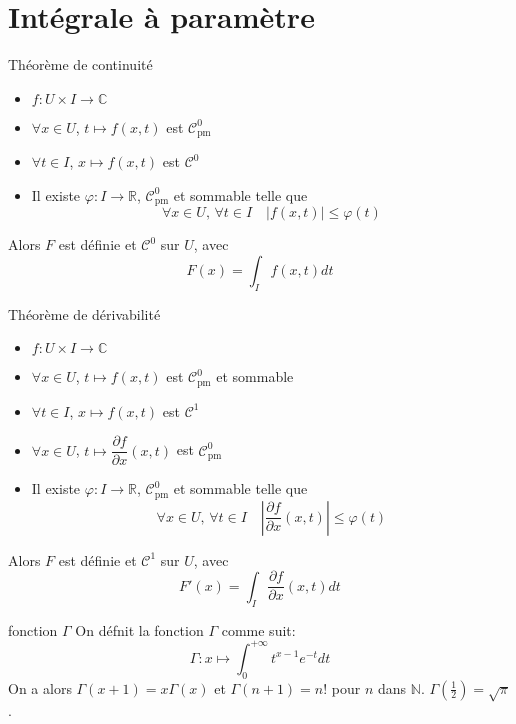 \documentclass[french, a4paper, 10pt, twocolumn]{article}
\newcommand{\N}{\mathbb{N}}   %
\newcommand{\R}{\mathbb{R}}   %
\newcommand{\C}{\mathbb{C}}   %
\newcommand{\czero}{\mathcal{C}^{0}}
\newcommand{\cun}{\mathcal{C}^{1}}
\renewcommand{\phi}{\varphi}
\begin{document}
\section{Intégrale à paramètre}
\begin{theoreme}{Théorème de continuité}
  \begin{itemize}[label=\(\bullet\)]
    \item \(f:U\times I\rightarrow\C\)
    \item \(\forall x\in U\), \(t\mapsto f(x,t)\) est \(\czero_{\text{pm}}\)
    \item \(\forall t \in I\), \(x\mapsto f(x,t)\) est \(\czero\)
    \item Il existe \(\phi : I\rightarrow \R\), \(\czero_{\text{pm}}\) et sommable telle que
      \[\forall x\in U,\,\forall t\in I\quad \vert f(x,t)\vert\leqslant\phi(t)\]
  \end{itemize}
  \tcblower
  Alors \(F\) est définie et \(\czero\) sur \(U\), avec
  \[F(x)=\int_{I}f(x,t)dt\]
\end{theoreme}

\begin{theoreme}{Théorème de dérivabilité}
  \begin{itemize}[label=\(\bullet\)]
    \item \(f:U\times I\rightarrow\C\)
    \item \(\forall x\in U\), \(t\mapsto f(x,t)\) est \(\czero_{\text{pm}}\) et sommable
    \item \(\forall t \in I\), \(x\mapsto f(x,t)\) est \(\cun\)
    \item \(\forall x\in U\), \(t\mapsto \dfrac{\partial f}{\partial x}(x,t)\) est \(\czero_{\text{pm}}\)
    \item Il existe \(\phi : I\rightarrow \R\), \(\czero_{\text{pm}}\) et sommable telle que
      \[\forall x\in U,\,\forall t\in I\quad \left\vert\dfrac{\partial f}{\partial x}(x,t)\right\vert\leqslant\phi(t)\]
  \end{itemize}
  \tcblower
  Alors \(F\) est définie et \(\cun\) sur \(U\), avec
  \[F'(x)=\int_{I}\dfrac{\partial f}{\partial x}(x,t)dt\]
\end{theoreme}

\begin{theoreme}{fonction \(\Gamma\)}
  On défnit la fonction \(\Gamma\) comme suit:
  \[\Gamma:x\mapsto\int_{0}^{+\infty}t^{x-1}e^{-t}dt\]
  On a alors \(\Gamma(x+1)=x\Gamma(x)\) et \(\Gamma(n+1)=n!\) pour \(n\) dans \(\N\). \(\Gamma(\frac{1}{2})=\sqrt{\pi}\).
\end{theoreme}
\end{document}
